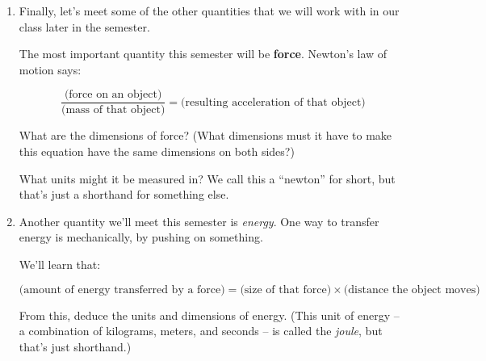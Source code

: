 \documentclass[12pt]{article}
\begin{document}
\begin{enumerate}
\item Finally, let's meet some of the other quantities that we will work with in our class later in the semester.

The most important quantity this semester will be {\bf force}. Newton's law of motion says:

$$
\frac{\text{(force on an object)}}{\text{(mass of that object)}} = \text{(resulting acceleration of that object)}
$$

What are the dimensions of force? (What dimensions must it have to make this equation have the same dimensions on both sides?)


\vspace{1in}

 What units might it be measured in? We call this a ``newton'' for short, but that's just a shorthand for something else.

\vspace{1in}

\item Another quantity we'll meet this semester is {\it energy}. One way to transfer energy is mechanically, by pushing on something.

We'll learn that:

$$
\text{(amount of energy transferred by a force)} = \text{(size of that force)} \times \text{(distance the object moves)}
$$

From this, deduce the units and dimensions of energy. (This unit of energy -- a combination of kilograms, meters, and seconds -- is called the {\it joule}, but that's just shorthand.)




\end{enumerate}
\end{document}
